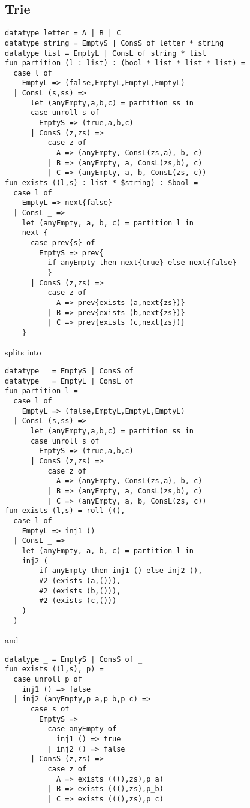 \subsection{Trie}

\begin{lstlisting} 
datatype letter = A | B | C
datatype string = EmptyS | ConsS of letter * string
datatype list = EmptyL | ConsL of string * list
fun partition (l : list) : (bool * list * list * list) =
  case l of
    EmptyL => (false,EmptyL,EmptyL,EmptyL)
  | ConsL (s,ss) =>
      let (anyEmpty,a,b,c) = partition ss in
      case unroll s of
        EmptyS => (true,a,b,c)
      | ConsS (z,zs) =>
          case z of 
            A => (anyEmpty, ConsL(zs,a), b, c) 
          | B => (anyEmpty, a, ConsL(zs,b), c) 
          | C => (anyEmpty, a, b, ConsL(zs, c))
fun exists ((l,s) : list * $string) : $bool =
  case l of 
    EmptyL => next{false} 
  | ConsL _ => 
    let (anyEmpty, a, b, c) = partition l in
    next {
      case prev{s} of
        EmptyS => prev{
          if anyEmpty then next{true} else next{false}
          }
      | ConsS (z,zs) =>
          case z of
            A => prev{exists (a,next{zs})}
          | B => prev{exists (b,next{zs})} 
          | C => prev{exists (c,next{zs})}
    }
\end{lstlisting}

splits into

\begin{lstlisting} 
datatype _ = EmptyS | ConsS of _
datatype _ = EmptyL | ConsL of _
fun partition l =
  case l of
    EmptyL => (false,EmptyL,EmptyL,EmptyL)
  | ConsL (s,ss) =>
      let (anyEmpty,a,b,c) = partition ss in
      case unroll s of
        EmptyS => (true,a,b,c)
      | ConsS (z,zs) =>
          case z of 
            A => (anyEmpty, ConsL(zs,a), b, c) 
          | B => (anyEmpty, a, ConsL(zs,b), c) 
          | C => (anyEmpty, a, b, ConsL(zs, c))
fun exists (l,s) = roll ((), 
  case l of 
    EmptyL => inj1 ()
  | ConsL _ => 
    let (anyEmpty, a, b, c) = partition l in
    inj2 (
    	if anyEmpty then inj1 () else inj2 (), 
    	#2 (exists (a,())), 
    	#2 (exists (b,())), 
    	#2 (exists (c,()))
    )
  )
\end{lstlisting}
and 
\begin{lstlisting} 
datatype _ = EmptyS | ConsS of _
fun exists ((l,s), p) =
  case unroll p of 
    inj1 () => false
  | inj2 (anyEmpty,p_a,p_b,p_c) => 
      case s of
        EmptyS => 
          case anyEmpty of 
            inj1 () => true 
          | inj2 () => false
      | ConsS (z,zs) =>
          case z of
            A => exists (((),zs),p_a)
          | B => exists (((),zs),p_b)
          | C => exists (((),zs),p_c)
\end{lstlisting}

